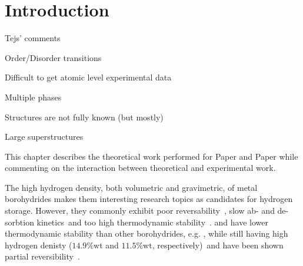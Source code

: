 \section{Introduction}
\label{sec:borohydrides-introduction}


Tejs' comments
\bit
\item Order/Disorder transitions
\item Difficult to get atomic level experimental data
\item Multiple phases
\item Structures are not fully known (but mostly)
\item Large superstructures
\eit

This chapter describes the theoretical work performed for Paper \missing and Paper \missing while commenting on the interaction between theoretical and experimental work.

The high hydrogen density, both volumetric and gravimetric, of metal borohydrides makes them interesting research topics as candidates for hydrogen storage.
However, they commonly exhibit poor reversability~\citemiss, slow ab- and de-sorbtion kinetics~\citemiss and too high thermodynamic stability~\citemiss.
 and  have lower thermodynamic stability than other borohydrides, e.g. , while still having high hydrogen denisty ($14.9\%\text{wt}$ and $11.5\%\text{wt}$, respectively)~\citemiss and have been shown partial reversibility~\citemiss.

